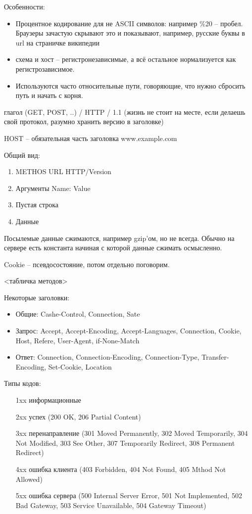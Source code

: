 \documentclass{book}
\theoremstyle{definition}
\begin{document}
    Особенности:
    \begin{itemize}
        \item Процентное кодирование для не ASCII символов: например \%20 -- пробел. Браузеры зачастую скрывают это и показывают, например, русские буквы в url на страничке википедии
        \item схема и хост -- регистронезависимые, а всё остальное нормализуется как регистрозависимое.
        \item Используются часто относительные пути, говоряющие, что нужно сбросить путь и начать с корня.
    \end{itemize}

    глагол (GET, POST, ..) / HTTP  / 1.1 (жизнь не стоит на месте, если делаешь свой протокол, разумно хранить версию в заголовке)

    HOST -- обязательная часть заголовка www.example.com

    Общий вид:
    \begin{enumerate}
        \item METHOS URL HTTP/Version
        \item Аргументы Name: Value
        \item Пустая строка
        \item Данные
    \end{enumerate}

    Посылемые данные сжимаются, например gzip'ом, но не всегда. Обычно на сервере есть константа начиная с которой данные сжимать осмысленно.

    Cookie -- псевдосостояние, потом отдельно поговорим.

    <табличка методов>

    Некоторые заголовки:
    \begin{itemize}
        \item Общие: Cashe-Control, Connection, Sate
        \item Запрос: Accept, Accept-Encoding, Accept-Languages, Connection, Cookie, Host, Refere, User-Agent, if-None-Match
        \item Ответ: Connection, Connection-Encoding, Connection-Type, Transfer-Encoding, Set-Cookie, Location
    \end{itemize}

    Типы кодов:
    \begin{enumerate}
        \item [1xx] информационные
        \item [2xx] успех (200 OK, 206 Partial Content)
        \item [3xx] перенаправление (301 Moved Permanently, 302 Moved Temporarily, 304 Not Modified, 303 See Other, 307 Temporarily Redirect, 308 Permanent Redirect)
        \item [4xx] ошибка клиента (403 Forbidden, 404 Not Found, 405 Mthod Not Allowed)
        \item [5xx] ошибка сервера (500 Internal Server Error, 501 Not Implemented, 502 Bad Gateway, 503 Service Unavailable, 504 Gateway Timeout)
    \end{enumerate}
\end{document}

